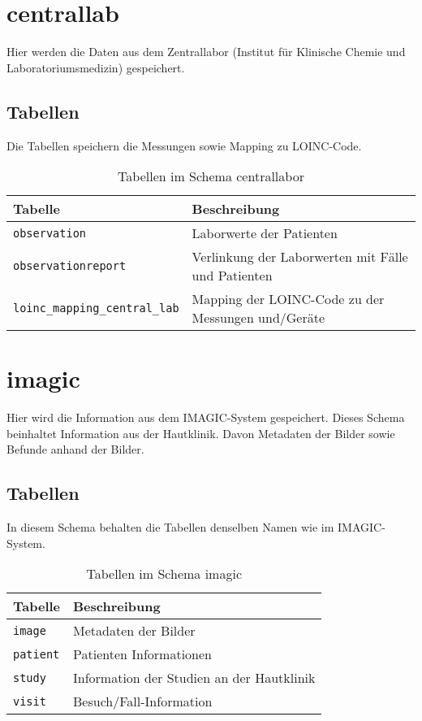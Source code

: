   \section{centrallab}
  Hier werden die Daten aus dem Zentrallabor (Institut für Klinische Chemie und Laboratoriumsmedizin) gespeichert.
  \subsection{Tabellen}
  Die Tabellen speichern die Messungen sowie Mapping zu LOINC-Code.
  \begin{table}[ht]
  	\centering
  	\caption{Tabellen im Schema centrallabor}
  	\begin{tabular}{|| l | l ||}
  		\hline
  		Tabelle & Beschreibung \\[0.5ex]
  		\hline\hline
  		\texttt{observation} & Laborwerte der Patienten \\
  		\hline
  		\texttt{observationreport} & Verlinkung der Laborwerten mit Fälle und Patienten \\
  		\hline
  		\texttt{loinc\_mapping\_central\_lab} & Mapping der LOINC-Code zu der Messungen und/Geräte \\
  		\hline
  	\end{tabular}
  \end{table}

\section{imagic}
Hier wird die Information aus dem IMAGIC-System gespeichert. Dieses Schema beinhaltet Information aus der Hautklinik. Davon Metadaten der Bilder sowie Befunde anhand der Bilder.
\subsection{Tabellen}
In diesem Schema behalten die Tabellen denselben Namen wie im IMAGIC-System. 
\begin{table}[ht]
	\centering   
	\caption{Tabellen im Schema imagic}
	\label{tb:ima}
	\begin{tabular}{||l|l||}   		
		\hline
		Tabelle & Beschreibung \\ [0.5ex]
		\hline\hline
		\texttt{image} & Metadaten der Bilder \\
		\hline
		\texttt{patient} & Patienten Informationen \\
		\hline
		\texttt{study} & Information der Studien an der Hautklinik \\
		\hline
		\texttt{visit} &  Besuch/Fall-Information\\
		\hline
	\end{tabular}
\end{table}

